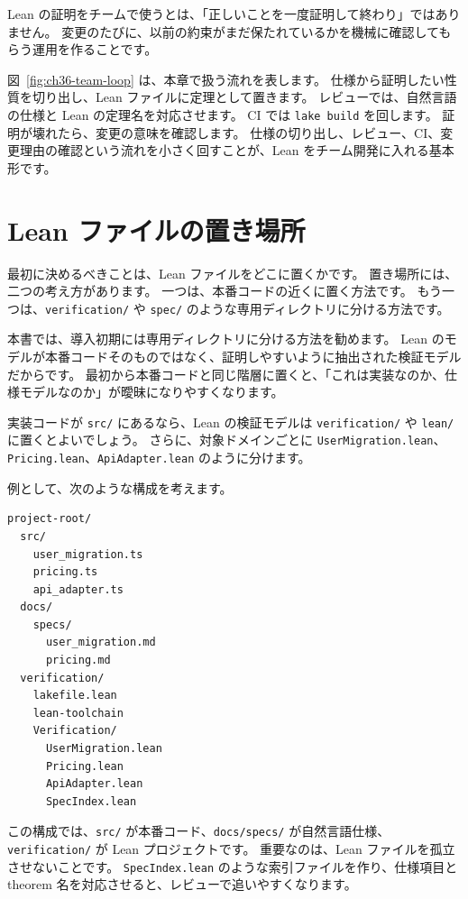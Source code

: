 Lean の証明をチームで使うとは、「正しいことを一度証明して終わり」ではありません。
変更のたびに、以前の約束がまだ保たれているかを機械に確認してもらう運用を作ることです。


図~\ref{fig:ch36-team-loop} は、本章で扱う流れを表します。
仕様から証明したい性質を切り出し、Lean ファイルに定理として置きます。
レビューでは、自然言語の仕様と Lean の定理名を対応させます。
CI では \texttt{lake build} を回します。
証明が壊れたら、変更の意味を確認します。
仕様の切り出し、レビュー、CI、変更理由の確認という流れを小さく回すことが、Lean をチーム開発に入れる基本形です。

\section{Lean ファイルの置き場所}

最初に決めるべきことは、Lean ファイルをどこに置くかです。
置き場所には、二つの考え方があります。
一つは、本番コードの近くに置く方法です。
もう一つは、\texttt{verification/} や \texttt{spec/} のような専用ディレクトリに分ける方法です。

本書では、導入初期には専用ディレクトリに分ける方法を勧めます。
Lean のモデルが本番コードそのものではなく、証明しやすいように抽出された検証モデルだからです。
最初から本番コードと同じ階層に置くと、「これは実装なのか、仕様モデルなのか」が曖昧になりやすくなります。

実装コードが \texttt{src/} にあるなら、Lean の検証モデルは \texttt{verification/} や \texttt{lean/} に置くとよいでしょう。
さらに、対象ドメインごとに \texttt{UserMigration.lean}、\texttt{Pricing.lean}、\texttt{ApiAdapter.lean} のように分けます。

例として、次のような構成を考えます。

\begin{listing}[htbp]
\begin{verbatim}
project-root/
  src/
    user_migration.ts
    pricing.ts
    api_adapter.ts
  docs/
    specs/
      user_migration.md
      pricing.md
  verification/
    lakefile.lean
    lean-toolchain
    Verification/
      UserMigration.lean
      Pricing.lean
      ApiAdapter.lean
      SpecIndex.lean
\end{verbatim}
\caption{\texttt{verification/} の構成}
\label{lst:ch36-directory-layout}
\end{listing}

この構成では、\texttt{src/} が本番コード、\texttt{docs/specs/} が自然言語仕様、\texttt{verification/} が Lean プロジェクトです。
重要なのは、Lean ファイルを孤立させないことです。
\texttt{SpecIndex.lean} のような索引ファイルを作り、仕様項目と theorem 名を対応させると、レビューで追いやすくなります。

